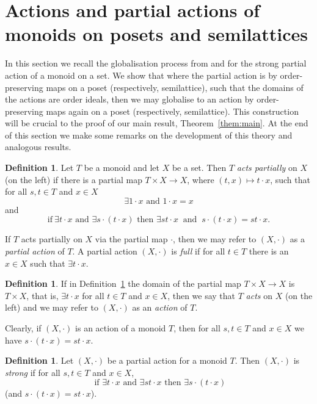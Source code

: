 \documentclass[12pt]{amsart}
\theoremstyle{definition}
\newtheorem{defn}[them]{Definition}
\theoremstyle{definition}
\numberwithin{them}{section}
\numberwithin{equation}{section}
\begin{document}
\section{Actions and partial actions of monoids on posets and semilattices}\label{sec:actions}


In this section we recall the globalisation process from \cite{meg:2004} and \cite{hollings:2007} for the strong partial action of a monoid on a set. We  show that where the partial action is by order-preserving maps on a poset (respectively, semilattice), such that the domains of the actions are order ideals, then  we may globalise to an action by order-preserving maps again on a poset (respectively, semilattice). This construction will be crucial to the proof of our main result, Theorem~\ref{them:main}.
  At the end of this section we make some remarks on the development of this theory and analogous results.


\begin{defn}\label{defn:paction} 
Let $T$ be a monoid and let $X$ be a set. Then $T$ {\em acts partially} on $X$ (on the left) if there is a partial map $T \times X \rightarrow X$, where $(t, x) \mapsto t \cdot x$, such that for all $s, t \in T$ and $x \in X$
\[\exists 1 \cdot x\mbox{ and } 1 \cdot x = x\]
and 
\[\mbox{if}\ \exists t \cdot x \mbox{ and }\exists s\cdot (t\cdot x) \mbox{ then }\exists st \cdot x\ \mbox{ and  }\ s \cdot (t \cdot x) = st \cdot x.\]

If $T$ acts partially on $X$ via the partial map $\cdot$,  then we may refer to $(X,\cdot)$ as a  {\em partial action} of $T$.  A partial action $(X,\cdot)$ is {\em full} if for all $t\in T$ there is an $x\in X$ such that $\exists t\cdot x$. 
\end{defn}


\begin{defn}\label{defn:action} If in  Definition~\ref{defn:paction} the domain of the partial 
 map $T\times X\rightarrow X$ is $T\times X$, that is, $\exists t\cdot x$   for all $t\in T$ and $x\in X$, then we say that $T$ {\em acts} on $X$ (on the left) and we may refer to $(X,\cdot)$ as an {\em action} of $T$. 
\end{defn}

Clearly,  if $(X,\cdot)$ is an action of a monoid $T$, then for all $s,t\in T$ and $x\in X$ we have $s\cdot (t\cdot x)=st\cdot x$. 


\begin{defn} \label{defn:strong} Let $(X,\cdot)$ be a partial action for a monoid  $T$.   Then $(X,\cdot)$  is  {\em strong} if for all $s,t\in T$ and $x\in X$, 
\[\mbox{ if }\exists t\cdot x\mbox{ and }
\exists st\cdot x\mbox{ then }\exists s\cdot (t\cdot x)\] {(and $s \cdot (t \cdot x) = st \cdot x$).} 
\end{defn}
\end{document}
